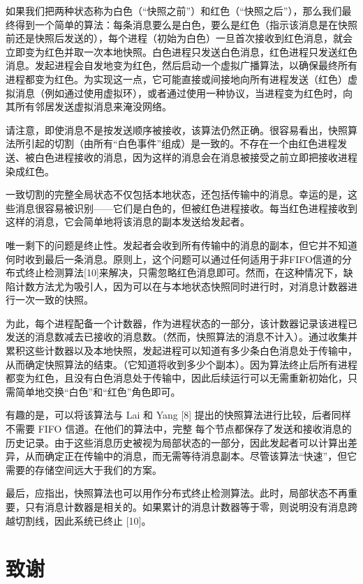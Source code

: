 \documentclass[12pt,a4paper]{report} %
\begin{document}
如果我们把两种状态称为白色（“快照之前”）和红色（“快照之后”），那么我们最终得到一个简单的算法：每条消息要么是白色，要么是红色（指示该消息是在快照前还是快照后发送的），每个进程（初始为白色）一旦首次接收到红色消息，就会立即变为红色并取一次本地快照。白色进程只发送白色消息，红色进程只发送红色消息。发起进程会自发地变为红色，然后启动一个虚拟广播算法，以确保最终所有进程都变为红色。为实现这一点，它可能直接或间接地向所有进程发送（红色）虚拟消息（例如通过使用虚拟环），或者通过使用一种协议，当进程变为红色时，向其所有邻居发送虚拟消息来淹没网络。

请注意，即使消息不是按发送顺序被接收，该算法仍然正确。很容易看出，快照算法所引起的切割（由所有“白色事件”组成）是一致的。不存在一个由红色进程发送、被白色进程接收的消息，因为这样的消息会在消息被接受之前立即把接收进程染成红色。

一致切割的完整全局状态不仅包括本地状态，还包括传输中的消息。幸运的是，这些消息很容易被识别——它们是白色的，但被红色进程接收。每当红色进程接收到这样的消息，它会简单地将该消息的副本发送给发起者。

唯一剩下的问题是终止性。发起者会收到所有传输中的消息的副本，但它并不知道何时收到最后一条消息。原则上，这个问题可以通过任何适用于非FIFO信道的分布式终止检测算法[10]来解决，只需忽略红色消息即可。然而，在这种情况下，缺陷计数方法尤为吸引人，因为可以在与本地状态快照同时进行时，对消息计数器进行一次一致的快照。

为此，每个进程配备一个计数器，作为进程状态的一部分，该计数器记录该进程已发送的消息数减去已接收的消息数。（然而，快照算法的消息不计入）。通过收集并累积这些计数器以及本地快照，发起进程可以知道有多少条白色消息处于传输中，从而确定快照算法的结束。（它知道将收到多少个副本）。因为算法终止后所有进程都变为红色，且没有白色消息处于传输中，因此后续运行可以无需重新初始化，只需简单地交换“白色”和“红色”角色即可。

有趣的是，可以将该算法与 Lai 和 Yang [8] 提出的快照算法进行比较，后者同样不需要 FIFO 信道。在他们的算法中，完整
每个节点都保存了发送和接收消息的历史记录。由于这些消息历史被视为局部状态的一部分，因此发起者可以计算出差异，从而确定正在传输中的消息，而无需等待消息副本。尽管该算法“快速”，但它需要的存储空间远大于我们的方案。

最后，应指出，快照算法也可以用作分布式终止检测算法。此时，局部状态不再重要，只有消息计数器是相关的。如果累计的消息计数器等于零，则说明没有消息跨越切割线，因此系统已终止 [10]。

\section*{致谢}
\end{document}
